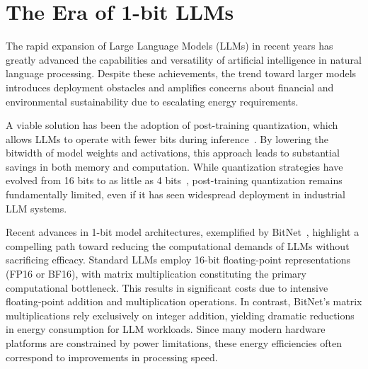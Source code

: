 \begin{abstract}
Emerging work, notably BitNet~\cite{bitnet}, is ushering in a paradigm shift toward 1-bit Large Language Models (LLMs). This paper presents a 1-bit LLM variant named \textbf{}, in which each individual model parameter takes on a ternary value from the set \{-1, 0, 1\}. This architecture achieves performance parity—both in terms of perplexity and downstream task effectiveness—with full-precision Transformer LLMs (utilizing FP16 or BF16), given the same parameter count and training data, while greatly reducing resource costs in latency, memory usage, throughput, and energy expenditure. More fundamentally, the 1.58-bit LLM establishes a novel scaling principle and methodology for training advanced LLMs that unite high efficiency with superior performance. Additionally, it paves the way for a new computational model and motivates the development of bespoke hardware architectures tuned for 1-bit LLMs.
\end{abstract}

\section{The Era of 1-bit LLMs}

The rapid expansion of Large Language Models (LLMs) in recent years has greatly advanced the capabilities and versatility of artificial intelligence in natural language processing. Despite these achievements, the trend toward larger models introduces deployment obstacles and amplifies concerns about financial and environmental sustainability due to escalating energy requirements.

A viable solution has been the adoption of post-training quantization, which allows LLMs to operate with fewer bits during inference~\cite{smoothquant, gptq, quip, quip_sharp}. By lowering the bitwidth of model weights and activations, this approach leads to substantial savings in both memory and computation. While quantization strategies have evolved from 16 bits to as little as 4 bits~\cite{gptq, awq}, post-training quantization remains fundamentally limited, even if it has seen widespread deployment in industrial LLM systems.

Recent advances in 1-bit model architectures, exemplified by BitNet~\cite{bitnet}, highlight a compelling path toward reducing the computational demands of LLMs without sacrificing efficacy. Standard LLMs employ 16-bit floating-point representations (FP16 or BF16), with matrix multiplication constituting the primary computational bottleneck. This results in significant costs due to intensive floating-point addition and multiplication operations. In contrast, BitNet's matrix multiplications rely exclusively on integer addition, yielding dramatic reductions in energy consumption for LLM workloads. Since many modern hardware platforms are constrained by power limitations, these energy efficiencies often correspond to improvements in processing speed.

